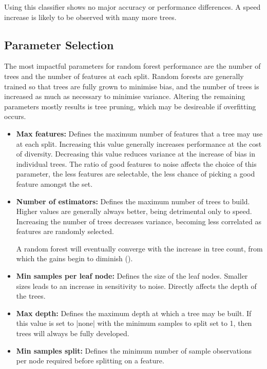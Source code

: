 Using this classifier shows no major accuracy or performance differences.
A speed increase is likely to be observed with many more trees.

\subsection{Parameter Selection}\label{sec:param}
The most impactful parameters for random forest performance are the number of
trees and the number of features at each split.
Random forests are generally trained so that trees are fully grown to minimise
bias, and the number of trees is increased as much as necessary to minimise variance.
Altering the remaining parameters mostly results is tree pruning, which may be
desireable if overfitting occurs.

\begin{itemize}
  \item \textbf{Max features:}
    Defines the maximum number of features that a tree may use at each split.
    Increasing this value generally increases performance at the cost of
    diversity.
    Decreasing this value reduces variance at the increase of bias in individual
    trees.
    The ratio of good features to noise affects the choice of this parameter,
    the less features are selectable, the less chance of picking a good feature
    amongst the set.

  \item \textbf{Number of estimators:}
    Defines the maximum number of trees to build.
    Higher values are generally always better, being detrimental only to speed.
    Increasing the number of trees decreases variance, becoming less
    correlated as features are randomly selected.

    A random forest will eventually converge with the increase in tree count,
    from which the gains begin to diminish (\textcite{breiman2001}).

  \item \textbf{Min samples per leaf node:}
    Defines the size of the leaf nodes.
    Smaller sizes leads to an increase in sensitivity to noise.
    Directly affects the depth of the trees.

  \item \textbf{Max depth:}
    Defines the maximum depth at which a tree may be built.
    If this value is set to |none| with the minimum samples to split set to 1,
    then trees will always be fully developed.

  \item \textbf{Min samples split:}
    Defines the minimum number of sample observations per node required before
    splitting on a feature.
\end{itemize}

